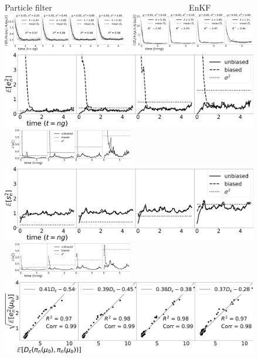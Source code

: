 \begin{figure}[t!]
\centering
Particle filter $\qquad \qquad \qquad \qquad \qquad \qquad \qquad \qquad $ EnKF\\
    \includegraphics[width=0.48\textwidth]{probing-nfs/plots/plots-bpf-effect of obs cov-rate_obs_cov_all.jpg} $\ \ $
    \includegraphics[width=0.48\textwidth]{probing-nfs/plots/plots-enkf-effect of ob cov-rate_all.jpg}\\
   \includegraphics[width=0.48\columnwidth]{probing-nfs/plots/plots-bpf-effect of obs cov-l2_obs_cov_all.jpg} $\ \ $
    \includegraphics[width=0.48\textwidth]{probing-nfs/plots/plots-enkf-effect of ob cov-mean_l2error_all.jpg}\\
   \includegraphics[width=0.48\columnwidth]{probing-nfs/plots/plots-bpf-effect of obs cov-trace_obs_cov_all.jpg} $\ \ $
    \includegraphics[width=0.48\textwidth]{probing-nfs/plots/plots-enkf-effect of ob cov-mean_trace_all.jpg}\\
   \includegraphics[width=0.48\columnwidth]{probing-nfs/plots/plots-bpf-effect of obs cov-dvl2_obs_cov_all.jpg} $\ \ $

\end{figure}
